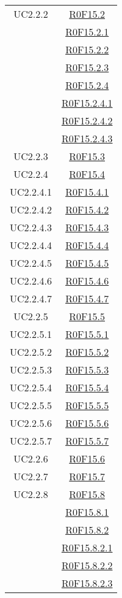 \documentclass[../AnalisiDeiRequisiti.tex]{subfiles}
\begin{document}
\begin{longtable}{|c|c|}
	UC2.2.2 & \hyperlink{R0F15.2}{R0F15.2}\\& \hyperlink{R0F15.2.1}{R0F15.2.1}\\& \hyperlink{R0F15.2.2}{R0F15.2.2}\\& \hyperlink{R0F15.2.3}{R0F15.2.3}\\& \hyperlink{R0F15.2.4}{R0F15.2.4}\\& \hyperlink{R0F15.2.4.1}{R0F15.2.4.1}\\& \hyperlink{R0F15.2.4.2}{R0F15.2.4.2}\\& \hyperlink{R0F15.2.4.3}{R0F15.2.4.3}\\\hline
	UC2.2.3 & \hyperlink{R0F15.3}{R0F15.3}\\\hline
	UC2.2.4 & \hyperlink{R0F15.4}{R0F15.4}\\\hline
	UC2.2.4.1 & \hyperlink{R0F15.4.1}{R0F15.4.1}\\\hline
	UC2.2.4.2 & \hyperlink{R0F15.4.2}{R0F15.4.2}\\\hline
	UC2.2.4.3 & \hyperlink{R0F15.4.3}{R0F15.4.3}\\\hline
	UC2.2.4.4 & \hyperlink{R0F15.4.4}{R0F15.4.4}\\\hline
	UC2.2.4.5 & \hyperlink{R0F15.4.5}{R0F15.4.5}\\\hline
	UC2.2.4.6 & \hyperlink{R0F15.4.6}{R0F15.4.6}\\\hline
	UC2.2.4.7 & \hyperlink{R0F15.4.7}{R0F15.4.7}\\\hline
	UC2.2.5 & \hyperlink{R0F15.5}{R0F15.5}\\\hline
	UC2.2.5.1 & \hyperlink{R0F15.5.1}{R0F15.5.1}\\\hline
	UC2.2.5.2 & \hyperlink{R0F15.5.2}{R0F15.5.2}\\\hline
	UC2.2.5.3 & \hyperlink{R0F15.5.3}{R0F15.5.3}\\\hline
	UC2.2.5.4 & \hyperlink{R0F15.5.4}{R0F15.5.4}\\\hline
	UC2.2.5.5 & \hyperlink{R0F15.5.5}{R0F15.5.5}\\\hline
	UC2.2.5.6 & \hyperlink{R0F15.5.6}{R0F15.5.6}\\\hline
	UC2.2.5.7 & \hyperlink{R0F15.5.7}{R0F15.5.7}\\\hline
	UC2.2.6 & \hyperlink{R0F15.6}{R0F15.6}\\\hline
	UC2.2.7 & \hyperlink{R0F15.7}{R0F15.7}\\\hline
	UC2.2.8 & \hyperlink{R0F15.8}{R0F15.8}\\& \hyperlink{R0F15.8.1}{R0F15.8.1}\\& \hyperlink{R0F15.8.2}{R0F15.8.2}\\& \hyperlink{R0F15.8.2.1}{R0F15.8.2.1}\\& \hyperlink{R0F15.8.2.2}{R0F15.8.2.2}\\& \hyperlink{R0F15.8.2.3}{R0F15.8.2.3}\\\hline

\end{longtable}
\end{document}
